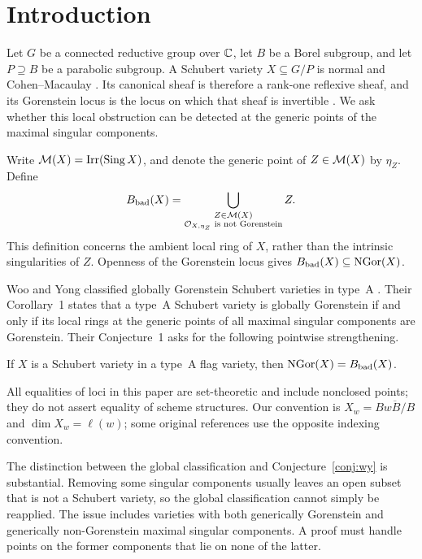 \section{Introduction}\label{sec:introduction}

Let $G$ be a connected reductive group over $\mathbb C$, let $B$ be a Borel subgroup, and let $P\supseteq B$ be a parabolic subgroup. A Schubert variety $X\subseteq G/P$ is normal and Cohen--Macaulay \cite{Ram85,Bri05}. Its canonical sheaf is therefore a rank-one reflexive sheaf, and its Gorenstein locus is the locus on which that sheaf is invertible \cite[Chapter~3]{BH93}. We ask whether this local obstruction can be detected at the generic points of the maximal singular components.

Write $\mathcal M(X)=\operatorname{Irr}(\operatorname{Sing} X)$, and denote the generic point of $Z\in\mathcal M(X)$ by $\eta_Z$. Define
\begin{equation}\label{eq:bad}
 B_{\mathrm{bad}}(X)=\bigcup_{\substack{Z\in\mathcal M(X)\\ \mathcal O_{X,\eta_Z}\text{ is not Gorenstein}}} Z.
\end{equation}
This definition concerns the ambient local ring of $X$, rather than the intrinsic singularities of $Z$. Openness of the Gorenstein locus gives $B_{\mathrm{bad}}(X)\subseteq\operatorname{NGor}(X)$.

Woo and Yong classified globally Gorenstein Schubert varieties in type~A \cite{WY06}. Their Corollary~1 states that a type~A Schubert variety is globally Gorenstein if and only if its local rings at the generic points of all maximal singular components are Gorenstein. Their Conjecture~1 asks for the following pointwise strengthening.

\begin{conjecture}\label{conj:wy}
If $X$ is a Schubert variety in a type~A flag variety, then $\operatorname{NGor}(X)=B_{\mathrm{bad}}(X)$.
\end{conjecture}

All equalities of loci in this paper are set-theoretic and include nonclosed points; they do not assert equality of scheme structures. Our convention is $X_w=\overline{BwB/B}$ and $\dim X_w=\ell(w)$; some original references use the opposite indexing convention.

The distinction between the global classification and Conjecture~\ref{conj:wy} is substantial. Removing some singular components usually leaves an open subset that is not a Schubert variety, so the global classification cannot simply be reapplied. The issue includes varieties with both generically Gorenstein and generically non-Gorenstein maximal singular components. A proof must handle points on the former components that lie on none of the latter.

